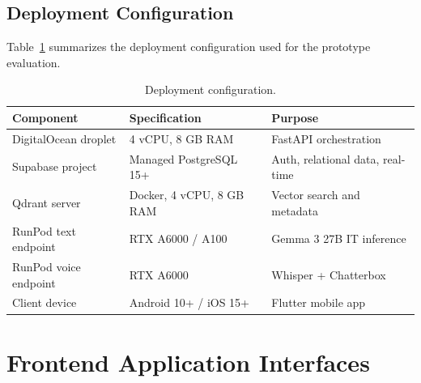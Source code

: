 \documentclass[12pt,a4paper,oneside,openany]{report}
\begin{document}
\subsection{Deployment Configuration}

Table~\ref{tab:deploy} summarizes the deployment configuration used for the prototype evaluation.

\begin{table}[H]
\centering\small
\caption{Deployment configuration.}
\label{tab:deploy}
\begin{tabular}{@{}lll@{}}
\toprule
Component & Specification & Purpose \\
\midrule
DigitalOcean droplet & 4 vCPU, 8 GB RAM & FastAPI orchestration \\
Supabase project & Managed PostgreSQL 15+ & Auth, relational data, real-time \\
Qdrant server & Docker, 4 vCPU, 8 GB RAM & Vector search and metadata \\
RunPod text endpoint & RTX A6000 / A100 & Gemma 3 27B IT inference \\
RunPod voice endpoint & RTX A6000 & Whisper + Chatterbox \\
Client device & Android 10+ / iOS 15+ & Flutter mobile app \\
\bottomrule
\end{tabular}
\end{table}

\section{Frontend Application Interfaces}
\end{document}

